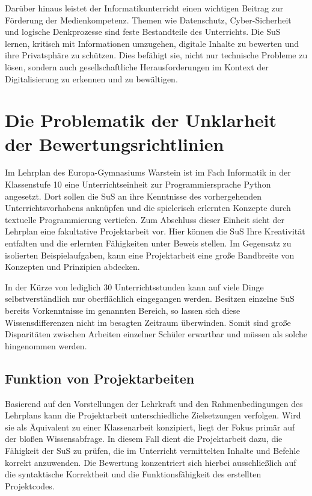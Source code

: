 \documentclass[a4paper,12pt]{article}
\begin{document}
Darüber hinaus leistet der Informatikunterricht einen wichtigen Beitrag zur Förderung der Medienkompetenz. Themen wie Datenschutz, Cyber-Sicherheit und logische Denkprozesse sind feste Bestandteile des Unterrichts. Die SuS lernen, kritisch mit Informationen umzugehen, digitale Inhalte zu bewerten und ihre Privatsphäre zu schützen. Dies befähigt sie, nicht nur technische Probleme zu lösen, sondern auch gesellschaftliche Herausforderungen im Kontext der Digitalisierung zu erkennen und zu bewältigen.


\section{Die Problematik der Unklarheit der Bewertungsrichtlinien}
Im Lehrplan des Europa-Gymnasiums Warstein ist im Fach Informatik in der Klassenstufe 10 eine Unterrichtseinheit zur Programmiersprache Python angesetzt. Dort sollen die SuS an ihre Kenntnisse des vorhergehenden Unterrichtsvorhabens anknüpfen und die spielerisch erlernten Konzepte durch textuelle Programmierung vertiefen. Zum Abschluss dieser Einheit sieht der Lehrplan eine fakultative Projektarbeit vor. Hier können die SuS Ihre Kreativität entfalten und die erlernten Fähigkeiten unter Beweis stellen. Im Gegensatz zu isolierten Beispielaufgaben, kann eine Projektarbeit eine große Bandbreite von Konzepten und Prinzipien abdecken.

In der Kürze von lediglich 30 Unterrichtsstunden kann auf viele Dinge selbstverständlich nur oberflächlich eingegangen werden. Besitzen einzelne SuS bereits Vorkenntnisse im genannten Bereich, so lassen sich diese Wissensdifferenzen nicht im besagten Zeitraum überwinden. Somit sind große Disparitäten zwischen Arbeiten einzelner Schüler erwartbar und müssen als solche hingenommen werden.


\subsection{Funktion von Projektarbeiten}
Basierend auf den Vorstellungen der Lehrkraft und den Rahmenbedingungen des Lehrplans kann die Projektarbeit unterschiedliche Zielsetzungen verfolgen. Wird sie als Äquivalent zu einer Klassenarbeit konzipiert, liegt der Fokus primär auf der bloßen Wissensabfrage. In diesem Fall dient die Projektarbeit dazu, die Fähigkeit der SuS zu prüfen, die im Unterricht vermittelten Inhalte und Befehle korrekt anzuwenden. Die Bewertung konzentriert sich hierbei ausschließlich auf die syntaktische Korrektheit und die Funktionsfähigkeit des erstellten Projektcodes.
\end{document}
